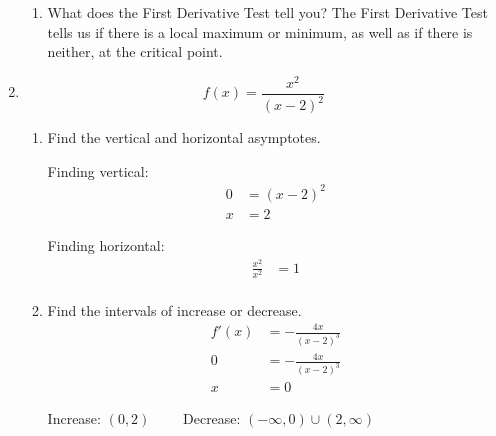 \documentclass{article}
\begin{document}
\begin{enumerate}
\begin{enumerate}
			\item What does the First Derivative Test tell you?\newline
			The First Derivative Test tells us if there is a local maximum or minimum, as well as if there is neither, at the critical point.
		\end{enumerate}
\setcounter{enumi}{33}
	\item $$f(x)=\frac{x^2}{(x-2)^2}$$
		\begin{enumerate}
			\item Find the vertical and horizontal asymptotes.
			\begin{center}
				\begin{minipage}[t]{0.48\linewidth}
					Finding vertical:
					$$\begin{align}
						0&=(x-2)^2\\
						x&=\boxed{2}
					\end{align}$$
				\end{minipage}
				\begin{minipage}[t]{0.48\linewidth}
					Finding horizontal:
					$$\begin{align}
						\frac{x^2}{x^2}&=\boxed{1} \\
					\end{align}$$
				\end{minipage}
			\end{center}
			\item Find the intervals of increase or decrease.\newline
			$$\begin{align}
				f'(x)&=-\frac{4x}{(x-2)^3}\\
				0&=-\frac{4x}{(x-2)^3}\\
				x&=0
			\end{align}$$
			\begin{center}
				Increase: $(0,2)\qquad$ Decrease: $(-\infty,0)\cup(2,\infty)$
			\end{center}
			

\end{enumerate}
\end{enumerate}
\end{document}
